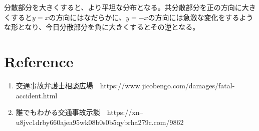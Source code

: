 \documentclass{article}
\begin{document}
分散部分を大きくすると、より平坦な分布となる。共分散部分を正の方向に大きくすると$y = x$の方向にはなだらかに、$y = -x$の方向には急激な変化をするような形となり、今日分散部分を負に大きくするとその逆となる。

\section{Reference}
\begin{enumerate}
	\item 交通事故弁護士相談広場　https://www.jicobengo.com/damages/fatal-accident.html
	\item 誰でもわかる交通事故示談　https://xn--u8jvc1drby660ajea95wk08b0s0b5qybrha279c.com/9862
\end{enumerate}
\end{document}
